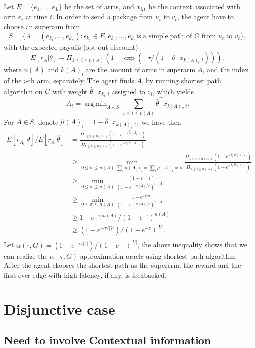 \documentclass[a4paper,11pt]{article}
\DeclareMathOperator*{\argmin}{arg\,min}
\begin{document}
Let $E=\{e_1,...,e_L\}$ be the set of arms, and $x_{i,t}$ be the context associated with arm $e_i$ at time $t$.
In order to send a package from $u_t$ to $v_t$,
the agent have to choose an superarm from $$S=\{A=(e_{k_1},...,e_{k_n}):e_{k_j}\in E, e_{k_1},...,e_{k_n} \text{is a simple path of } G \text{ from } u_t \text{ to } v_t\},$$
with the expected payoffs (opt out discount) $$E[r_A|\theta]=\Pi_{1\leq i\leq n(A)}(1-\exp(-\tau/(1-\theta^{\top}x_{k(A)_i,t}))),$$
where $n(A)$ and $k(A)_i$ are the amount of arms in superarm $A$, and the index of the $i$-th arm, separately.
The agent finds $A_t$ by running shortest path algorithm on $G$ with weight $\hat{\theta}^{\top}x_{k_i,t}$ assigned to $e_i$, which yields $$A_t=\argmin_{A\in S}\sum_{1\leq i\leq n(A)}\hat{\theta}^{\top}x_{k(A)_i,t}.$$
For $A\in S$, denote $\hat{\mu}(A)_i=1-\hat{\theta}^{\top}x_{k(A)_i,t},$ we have then 
\begin{align*}
  E[r_{A_t}|\hat{\theta}]/E[r_A|\hat{\theta}] &= \frac{\Pi_{1\leq i\leq n(A_t)}(1-e^{-\tau/\hat{\mu}(A_t)_i})}{\Pi_{1\leq i\leq n(A)}(1-e^{-\tau/\hat{\mu}(A)_i})}\\
  &\geq \min_{0\leq \sigma \leq n(A), \sum_i \hat{\mu}(A_t)_i=\sum_i \hat{\mu}(A)_i=\sigma}\frac{\Pi_{1\leq i\leq n(A_t)}(1-e^{-\tau/\hat{\mu}(A_t)_i})}{\Pi_{1\leq i\leq n(A)}(1-e^{-\tau/\hat{\mu}(A)_i})}\\
  &\geq \min_{0\leq \sigma \leq n(A)}\frac{(1-e^{-\tau})^\sigma}{(1-e^{-\tau n(A)/\sigma})^{n(A)}}\\
  &\geq \min_{0\leq \sigma \leq n(A)}\frac{1-e^{-\tau/\sigma}}{(1-e^{-\tau n(A)/\sigma})^{n(A)}}\\
  &\geq 1-e^{-\tau/n(A)}/(1-e^{-\tau})^{n(A)}\\
  &\geq (1-e^{-\tau/|V|})/(1-e^{-\tau})^{|V|}.\\
\end{align*}
Let $\alpha(\tau, G)=(1-e^{-\tau/|V|})/(1-e^{-\tau})^{|V|}$, the above inequality shows that we can realize the $\alpha(\tau, G)$-approximation oracle using shortest path algorithm.
After the agent chooses the shortest path as the superarm, the reward and the first ever edge with high latency, if any, is feedbacked.

\section{Disjunctive case}

\subsection{Need to involve Contextual information}
\end{document}
